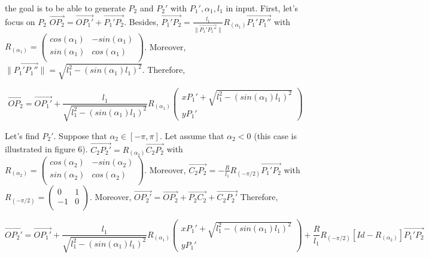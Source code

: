 \documentclass[a4paper,12pt,fleqn]{article}
\begin{document}
the goal is to be able to generate \mbox{$P_2$} and \mbox{$P_2{'}$} with \mbox{$P_1{'}, \alpha_1, l_1$} in input. First, let's focus on \mbox{$P_2$} \mbox{$\overrightarrow{OP_2} = \overrightarrow{OP_1{'}} + \overrightarrow{P_1{'}P_2}$}. Besides,  \mbox{$\overrightarrow{P_1{'}P_2} = \frac{l_1}{\lVert \overrightarrow{P_1{'}P_1{''}} \rVert} R_(\alpha_1) \overrightarrow{P_1{'}P_1{''}}$}
with \mbox{$R_(\alpha_1) = \begin{pmatrix} 
cos(\alpha_1) &  -sin(\alpha_1)\\ 
sin(\alpha_1) & cos(\alpha_1) \\ 
\end{pmatrix}$}. 
\newline
Moreover, \mbox{$\lVert \overrightarrow{P_1{'}P_1{''}} \rVert = \sqrt{l_1^2 - (sin(\alpha_1)l_1)^2}$}. Therefore,

\[ \overrightarrow{OP_2} =  \overrightarrow{OP_1{'}} + \frac{l_1}{\sqrt{l_1^2 - (sin(\alpha_1)l_1)^2}} R_(\alpha_1) 
\begin{pmatrix}
\mbox{$xP_1{'} + \sqrt{l_1^2 - (sin(\alpha_1)l_1)^2}$} \\
\mbox{$yP_1{'}$}
\end{pmatrix}	
\]

Let's find \mbox{$P_2{'}$}. Suppose that \mbox{$\alpha_2 \in [-\pi, \pi]$}. Let assume that \mbox{$\alpha_2 < 0$} (this case is illustrated in figure 6).
\mbox{$\overrightarrow{C_2P_2{'}} = R_(\alpha_2) \overrightarrow{C_2P_2}$} with \mbox{$R_(\alpha_2) = \begin{pmatrix} 
cos(\alpha_2) &  -sin(\alpha_2)\\ 
sin(\alpha_2) & cos(\alpha_2) \\ 
\end{pmatrix}$}. 
\newline
Moreover, \mbox{$\overrightarrow{C_2P_2} = - \frac{R}{l_1} R_(-\pi/2)\overrightarrow{P_1{'}P_2}$} with
\mbox{$R_(- \pi/2) = \begin{pmatrix} 
0 &  1\\ 
-1 & 0 \\ 
\end{pmatrix}$}.
\newline
Moreover, \mbox{$\overrightarrow{OP_2{'}} = \overrightarrow{OP_2} + \overrightarrow{P_2C_2} + \overrightarrow{C_2P_2{'}}$}
\newline
Therefore,
 
\[\overrightarrow{OP_2{'}} = \overrightarrow{OP_1{'}} + \frac{l_1}{\sqrt{l_1^2 - (sin(\alpha_1)l_1)^2}} R_(\alpha_1) 
\begin{pmatrix}
\mbox{$xP_1{'} + \sqrt{l_1^2 - (sin(\alpha_1)l_1)^2}$} \\
\mbox{$yP_1{'}$}
\end{pmatrix} + \frac{R}{l_1} R_(-\pi/2)[Id - R_(\alpha_2)]\overrightarrow{P_1{'}P_2}\]
\end{document}
